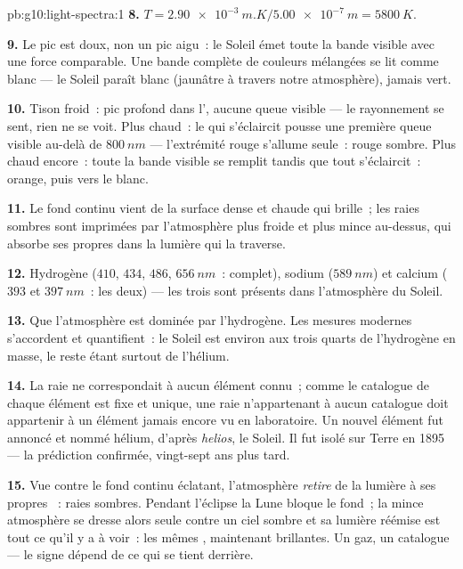 \begin{solution}{pb:g10:light-spectra:1}
\textbf{8.} $T = \qty{2.90e-3}{m.K} / \qty{5.00e-7}{m} = \qty{5800}{K}$.

\textbf{9.} Le pic est doux, non un pic aigu~: le Soleil émet toute la
bande visible avec une force comparable. Une bande complète de couleurs
mélangées se lit comme blanc --- le Soleil paraît blanc (jaunâtre à
travers notre atmosphère), jamais vert.

\textbf{10.} Tison froid~: pic profond dans l', aucune
queue visible --- le rayonnement se sent, rien ne se voit. Plus chaud~:
le  qui s'éclaircit pousse une première queue visible au-delà
de $\qty{800}{nm}$ --- l'extrémité rouge s'allume seule~: rouge sombre.
Plus chaud encore~: toute la bande visible se remplit tandis que tout
s'éclaircit~: orange, puis vers le blanc.

\textbf{11.} Le fond continu vient de la surface dense et chaude qui
brille~; les raies sombres sont imprimées par l'atmosphère plus froide
et plus mince au-dessus, qui absorbe ses propres
 dans la lumière qui la traverse.

\textbf{12.} Hydrogène ($410$, $434$, $486$, $\qty{656}{nm}$~: complet),
sodium ($\qty{589}{nm}$) et calcium ($393$ et $\qty{397}{nm}$~: les
deux) --- les trois sont présents dans l'atmosphère du Soleil.

\textbf{13.} Que l'atmosphère est dominée par l'hydrogène. Les mesures
modernes s'accordent et quantifient~: le Soleil est environ aux trois
quarts de l'hydrogène en masse, le reste étant surtout de l'hélium.

\textbf{14.} La raie ne correspondait à aucun élément connu~; comme le
catalogue de chaque élément est fixe et unique, une raie n'appartenant
à aucun catalogue doit appartenir à un élément jamais encore vu en
laboratoire. Un nouvel élément fut annoncé et nommé hélium, d'après
\emph{helios}, le Soleil. Il fut isolé sur Terre en 1895 --- la
prédiction confirmée, vingt-sept ans plus tard.

\textbf{15.} Vue contre le fond continu éclatant, l'atmosphère
\emph{retire} de la lumière à ses propres ~: raies
sombres. Pendant l'éclipse la Lune bloque le fond~; la mince
atmosphère se dresse alors seule contre un ciel sombre et sa lumière
réémise est tout ce qu'il y a à voir~: les mêmes
, maintenant brillantes. Un gaz, un catalogue
--- le signe dépend de ce qui se tient derrière.


\end{solution}
